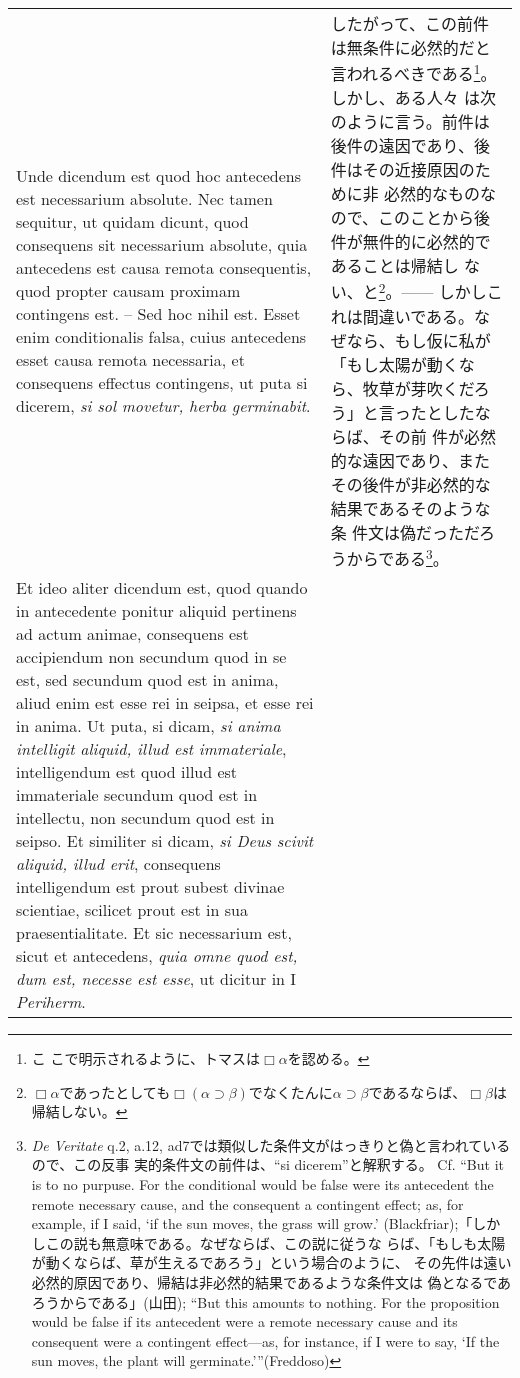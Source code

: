 \documentclass[10pt]{jsarticle} %
\begin{document}
\begin{longtable}{p{21em}p{21em}}
\\


Unde dicendum est quod hoc antecedens est necessarium absolute. Nec
tamen sequitur, ut quidam dicunt, quod consequens sit necessarium
absolute, quia antecedens est causa remota consequentis, quod propter
causam proximam contingens est. -- Sed hoc nihil est. Esset enim
conditionalis falsa, cuius antecedens esset causa remota necessaria, et
consequens effectus contingens, ut puta si dicerem, {\itshape si sol
movetur, herba germinabit}.

&

したがって、この前件は無条件に必然的だと言われるべきである\footnote{こ
こで明示されるように、トマスは$\Box \alpha$を認める。}。しかし、ある人々
は次のように言う。前件は後件の遠因であり、後件はその近接原因のために非
必然的なものなので、このことから後件が無件的に必然的であることは帰結し
ない、と\footnote{$\Box \alpha$であったとしても$\Box(\alpha \supset
\beta)$でなくたんに$\alpha \supset \beta$であるならば、$\Box \beta$は
帰結しない。}。------ しかしこれは間違いである。なぜなら、もし仮に私が
「もし太陽が動くなら、牧草が芽吹くだろう」と言ったとしたならば、その前
件が必然的な遠因であり、またその後件が非必然的な結果であるそのような条
件文は偽だっただろうからである\footnote{{\itshape De Veritate} q.2,
a.12, ad7では類似した条件文がはっきりと偽と言われているので、この反事
実的条件文の前件は、``si dicerem''と解釈する。 Cf. ``But it is to no
purpuse. For the conditional would be false were its antecedent the
remote necessary cause, and the consequent a contingent effect; as,
for example, if I said, `if the sun moves, the grass will grow.'
(Blackfriar);「しかしこの説も無意味である。なぜならば、この説に従うな
らば、「もしも太陽が動くならば、草が生えるであろう」という場合のように、
その先件は遠い必然的原因であり、帰結は非必然的結果であるような条件文は
偽となるであろうからである」(山田); ``But this amounts to nothing. For
the proposition would be false if its antecedent were a remote
necessary cause and its consequent were a contingent effect—as, for
instance, if I were to say, ‘If the sun moves, the plant will
germinate.’''(Freddoso)}。

\\


Et ideo aliter dicendum est, quod quando in antecedente ponitur aliquid
pertinens ad actum animae, consequens est accipiendum non secundum quod
in se est, sed secundum quod est in anima, aliud enim est esse rei in
seipsa, et esse rei in anima. Ut puta, si dicam, {\itshape si anima
intelligit aliquid, illud est immateriale}, intelligendum est quod illud
est immateriale secundum quod est in intellectu, non secundum quod est
in seipso. Et similiter si dicam, {\itshape si Deus scivit aliquid,
illud erit}, consequens intelligendum est prout subest divinae
scientiae, scilicet prout est in sua praesentialitate. Et sic
necessarium est, sicut et antecedens, {\itshape quia omne quod est, dum
est, necesse est esse}, ut dicitur in I {\itshape Periherm}.



\end{longtable}
\end{document}
